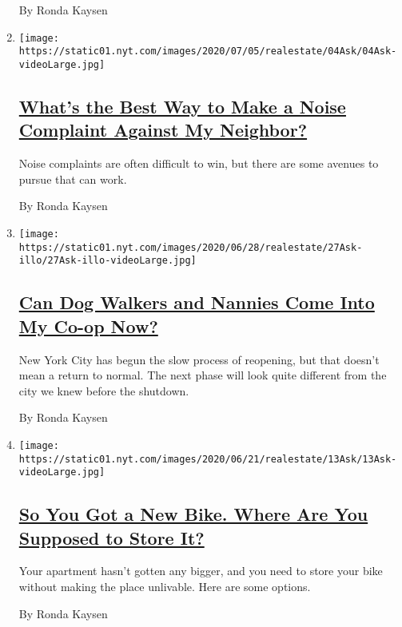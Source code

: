 \begin{enumerate}
  By Ronda Kaysen
\item
  \texttt{[image: https://static01.nyt.com/images/2020/07/05/realestate/04Ask/04Ask-videoLarge.jpg]}

  \hypertarget{whats-the-best-way-to-make-a-noise-complaint-against-my-neighbor}{%
  \subsection{\texorpdfstring{\href{/2020/07/04/realestate/whats-the-best-way-to-make-a-noise-complaint-against-my-neighbor.html}{What's
  the Best Way to Make a Noise Complaint Against My
  Neighbor?}}{What's the Best Way to Make a Noise Complaint Against My Neighbor?}}\label{whats-the-best-way-to-make-a-noise-complaint-against-my-neighbor}}

  Noise complaints are often difficult to win, but there are some
  avenues to pursue that can work.

  By Ronda Kaysen
\item
  \texttt{[image: https://static01.nyt.com/images/2020/06/28/realestate/27Ask-illo/27Ask-illo-videoLarge.jpg]}

  \hypertarget{can-dog-walkers-and-nannies-come-into-my-co-op-now}{%
  \subsection{\texorpdfstring{\href{/2020/06/29/realestate/coronavirus-phase-2-dog-walkers-nannies-co-op.html}{Can
  Dog Walkers and Nannies Come Into My Co-op
  Now?}}{Can Dog Walkers and Nannies Come Into My Co-op Now?}}\label{can-dog-walkers-and-nannies-come-into-my-co-op-now}}

  New York City has begun the slow process of reopening, but that
  doesn't mean a return to normal. The next phase will look quite
  different from the city we knew before the shutdown.

  By Ronda Kaysen
\item
  \texttt{[image: https://static01.nyt.com/images/2020/06/21/realestate/13Ask/13Ask-videoLarge.jpg]}

  \hypertarget{so-you-got-a-new-bike-where-are-you-supposed-to-store-it}{%
  \subsection{\texorpdfstring{\href{/2020/06/20/realestate/bike-bicycle-rack-apartment-storage-coronavirus.html}{So
  You Got a New Bike. Where Are You Supposed to Store
  It?}}{So You Got a New Bike. Where Are You Supposed to Store It?}}\label{so-you-got-a-new-bike-where-are-you-supposed-to-store-it}}

  Your apartment hasn't gotten any bigger, and you need to store your
  bike without making the place unlivable. Here are some options.

  By Ronda Kaysen
\end{enumerate}

